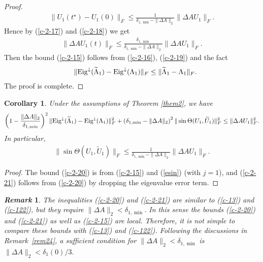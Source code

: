 \documentclass[11pt,a4paper]{article}
\numberwithin{equation}{section}
\newtheorem{Corollary}{Corollary}[section]
\newtheorem{Remark}{{\it Remark}}[section]
\newcommand {\wt} {\widetilde}
\begin{document}
\begin{proof}
\begin{eqnarray}
\|{U_1(t^\star)-U_1(0)}\|_F\leq \frac1 {\delta_{1,\min}-\|{\Delta A}\|_2}\|{\Delta AU_1}\|_F.
\end{eqnarray}
Hence by (\ref{c-2-17}) and (\ref{c-2-18}) we get
\begin{eqnarray}\label{c-2-19}
\|{\Delta A U_1(t)}\|_F\leq
\frac{\delta_{1,\min}}{\delta_{1,\min}-\|{\Delta A}\|_2}\|{\Delta AU_1}\|_F.
\end{eqnarray}
Then the bound (\ref{c-2-15}) follows from (\ref{c-2-16}), (\ref{c-2-19}) and the fact
\begin{eqnarray*}
&&\|{\rm Eig}^{\downarrow}(\wt\Lambda_1)-{\rm Eig}^{\downarrow}(\Lambda_1)\|_F
\leq \| \wt\Lambda_1-\Lambda_1\|_F.
\end{eqnarray*}
The proof is complete.
\end{proof}

\medskip

\begin{Corollary}\label{cor1}
Under the assumptions of Theorem \ref{them2}, we have
{\footnotesize \begin{eqnarray}\label{c-2-20}
\left(1-\frac{\|{\Delta A}\|_2}{\delta_{1,\min}}\right)^2\|{\rm Eig}^{\downarrow}(\wt \Lambda_1)-{\rm Eig}^{\downarrow}(\Lambda_1)\|_F^2+\left(\delta_{1,\min}-\|{\Delta A}\|_2\right)^2\|\sin\Theta(U_1,\wt U_1)\|_F^2\leq \|\Delta AU_1\|_F^2.
\end{eqnarray}}
In particular,
{\footnotesize\begin{eqnarray}\label{c-2-21}
\|\sin\Theta(U_1,\wt U_1)\|_F\leq \frac{1}{\delta_{1,\min}-\|{\Delta A}\|_2}\|\Delta AU_1\|_F.
\end{eqnarray}}
\end{Corollary}

\medskip

\begin{proof}
The bound (\ref{c-2-20}) is from (\ref{c-2-15}) and (\ref{esin}) (with $j=1$),
and (\ref{c-2-21}) follows from (\ref{c-2-20})
by dropping the eigenvalue error term.
\end{proof}

\medskip

\begin{Remark}
The inequalities (\ref{c-2-20}) and (\ref{c-2-21}) are similar to  (\ref{c-13}) and (\ref{c-122}), but
they require $\|\Delta A\|_2<\delta_{1,\min}$. In this sense the bounds (\ref{c-2-20}) and (\ref{c-2-21})
as well as (\ref{c-2-15}) are local. Therefore, it is not simple to compare these bounds with
 (\ref{c-13}) and (\ref{c-122}).  Following the discussions in Remark~\ref{rem24},
 a sufficient condition for $\|\Delta A\|_2<\delta_{1,\min}$ is  $\|\Delta A\|_2<\delta_1(0)/3.$
\end{Remark}
\end{document}

